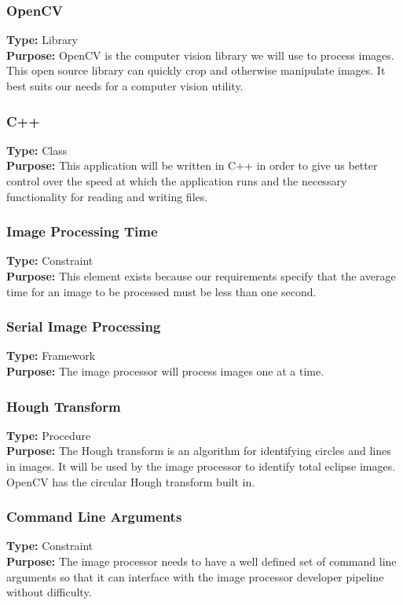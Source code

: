 \documentclass[10pt, onecolumn, draftclsnofoot, letterpaper, compsoc]{IEEEtran}
\begin{document}
\subsubsection{OpenCV}
\textbf{Type:} Library\\
\textbf{Purpose:} OpenCV is the computer vision library we will use to process
images. This open source library can quickly crop and otherwise manipulate
images. It best suits our needs for a computer vision utility.\\

\subsubsection{C++}
\textbf{Type:} Class\\
\textbf{Purpose:} This application will be written in C++ in order to give us
better control over the speed at which the application runs and the necessary
functionality for reading and writing files. \\

\subsubsection{Image Processing Time}
\textbf{Type:} Constraint\\
\textbf{Purpose:} This element exists because our requirements specify that the
average time for an image to be processed must be less than one second.\\

\subsubsection{Serial Image Processing}
\textbf{Type:} Framework\\
\textbf{Purpose:} The image processor will process images one at a time. \\

\subsubsection{Hough Transform}
\textbf{Type:} Procedure\\
\textbf{Purpose:} The Hough transform is an algorithm for identifying circles
and lines in images. It will be used by the image processor to identify total
eclipse images. OpenCV has the circular Hough transform built in. \\

\subsubsection{Command Line Arguments}
\textbf{Type:} Constraint\\
\textbf{Purpose:} The image processor needs to have a well defined set of
command line arguments so that it can interface with the image processor
developer pipeline without difficulty. \\
\end{document}
